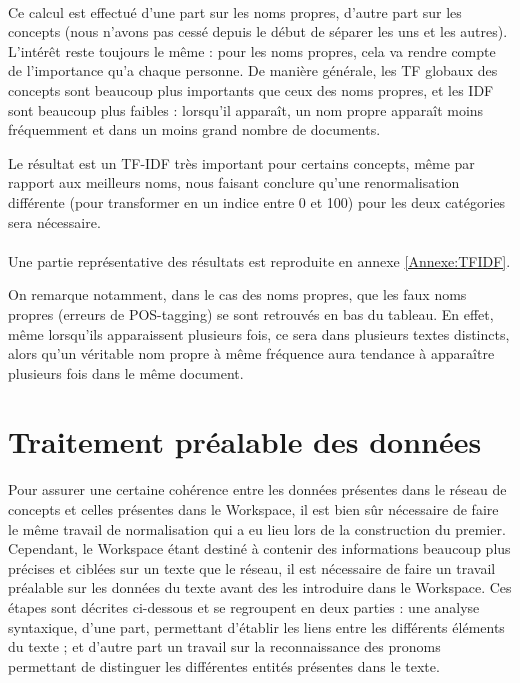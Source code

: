 \documentclass[a4paper, 12pt]{article}
\begin{document}
\paragraph{}
Ce calcul est effectué d'une part sur les noms propres, d'autre part sur les concepts (nous n'avons pas cessé depuis le début de séparer les uns et les autres). L'intérêt reste toujours le même : pour les noms propres, cela va rendre compte de l'importance qu'a chaque personne. De manière générale, les TF globaux des concepts sont beaucoup plus importants que ceux des noms propres, et les IDF sont beaucoup plus faibles : lorsqu'il apparaît, un nom propre apparaît moins fréquemment et dans un moins grand nombre de documents.

Le résultat est un TF-IDF très important pour certains concepts, même par rapport aux meilleurs noms, nous faisant conclure qu'une renormalisation différente (pour transformer en un indice entre 0 et 100) pour les deux catégories sera nécessaire.

\paragraph{}
Une partie représentative des résultats est reproduite en annexe \ref{Annexe:TFIDF}.

On remarque notamment, dans le cas des noms propres, que les faux noms propres (erreurs de POS-tagging) se sont retrouvés en bas du tableau. En effet, même lorsqu'ils apparaissent plusieurs fois, ce sera dans plusieurs textes distincts, alors qu'un véritable nom propre à même fréquence aura tendance à apparaître plusieurs fois dans le même document.


\section{Traitement préalable des données}

Pour assurer une certaine cohérence entre les données présentes dans le réseau de concepts et celles présentes dans le Workspace, il est bien sûr nécessaire de faire le même travail de normalisation qui a eu lieu lors de la construction du premier. Cependant, le Workspace étant destiné à contenir des informations beaucoup plus précises et ciblées sur un texte que le réseau, il est nécessaire de faire un travail préalable sur les données du texte avant des les introduire dans le Workspace. Ces étapes sont décrites ci-dessous et se regroupent en deux parties : une analyse syntaxique, d'une part, permettant d'établir les liens entre les différents éléments du texte ; et d'autre part un travail sur la reconnaissance des pronoms permettant de distinguer les différentes entités présentes dans le texte.
\end{document}
